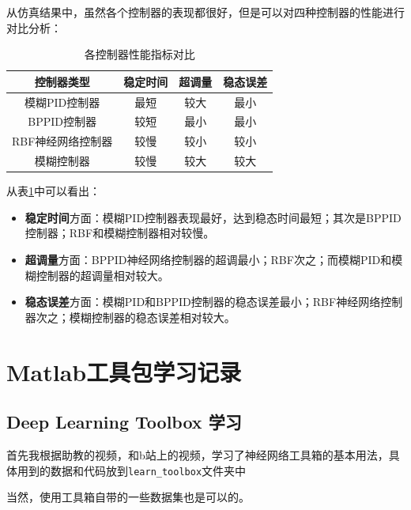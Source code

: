 \documentclass[12pt,a4paper,UTF8]{article}
\begin{document}
从仿真结果中，虽然各个控制器的表现都很好，但是可以对四种控制器的性能进行对比分析：

\begin{table}[htbp]
    \centering
    \caption{各控制器性能指标对比}
    \begin{tabular}{|c|c|c|c|}
        \hline
        控制器类型 & 稳定时间 & 超调量 & 稳态误差 \\
        \hline
        模糊PID控制器 & 最短 & 较大 & 最小 \\
        \hline
        BPPID控制器 & 较短 & 最小 & 最小 \\
        \hline
        RBF神经网络控制器 & 较慢 & 较小 & 较小 \\
        \hline
        模糊控制器 & 较慢 & 较大 & 较大 \\
        \hline
    \end{tabular}
    \label{tab:controller_comparison}
\end{table}

从表\ref{tab:controller_comparison}中可以看出：

\begin{itemize}
    \item \textbf{稳定时间}方面：模糊PID控制器表现最好，达到稳态时间最短；其次是BPPID控制器；RBF和模糊控制器相对较慢。
    
    \item \textbf{超调量}方面：BPPID神经网络控制器的超调最小；RBF次之；而模糊PID和模糊控制器的超调量相对较大。
    
    \item \textbf{稳态误差}方面：模糊PID和BPPID控制器的稳态误差最小；RBF神经网络控制器次之；模糊控制器的稳态误差相对较大。
\end{itemize}



\clearpage
\section{Matlab工具包学习记录}

\subsection{Deep Learning Toolbox 学习}

首先我根据助教的视频，和b站上的视频，学习了神经网络工具箱的基本用法，具体用到的数据和代码放到\texttt{learn\_toolbox}文件夹中

当然，使用工具箱自带的一些数据集也是可以的。
\end{document}
